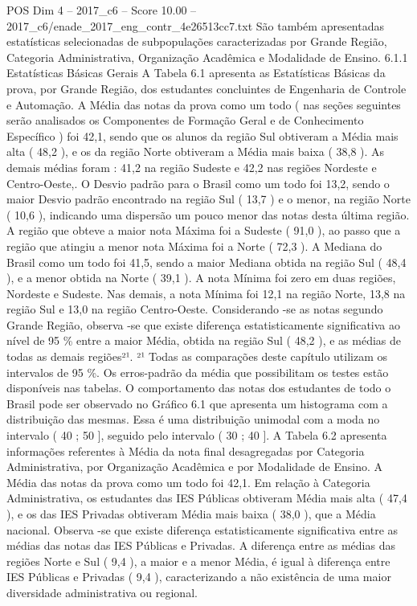 \begin{textsample}{POS Dim 4 – 2017\_c6 – Score 10.00 – 2017\_c6/enade\_2017\_eng\_contr\_4e26513cc7.txt}
São também apresentadas estatísticas selecionadas de subpopulações caracterizadas por Grande Região, Categoria Administrativa, Organização Acadêmica e Modalidade de Ensino. 6.1.1 Estatísticas Básicas Gerais A Tabela 6.1 apresenta as Estatísticas Básicas da prova, por Grande Região, dos estudantes concluintes de Engenharia de Controle e Automação.
A Média das notas da prova como um todo ( nas seções seguintes serão analisados os Componentes de Formação Geral e de Conhecimento Específico ) foi 42,1, sendo que os alunos da região Sul obtiveram a Média mais alta ( 48,2 ), e os da região Norte obtiveram a Média mais baixa ( 38,8 ).
As demais médias foram : 41,2 na região Sudeste e 42,2 nas regiões Nordeste e Centro-Oeste,.
O Desvio padrão para o Brasil como um todo foi 13,2, sendo o maior Desvio padrão encontrado na região Sul ( 13,7 ) e o menor, na região Norte ( 10,6 ), indicando uma dispersão um pouco menor das notas desta última região.
A região que obteve a maior nota Máxima foi a Sudeste ( 91,0 ), ao passo que a região que atingiu a menor nota Máxima foi a Norte ( 72,3 ).
A Mediana do Brasil como um todo foi 41,5, sendo a maior Mediana obtida na região Sul ( 48,4 ), e a menor obtida na Norte ( 39,1 ).
A nota Mínima foi zero em duas regiões, Nordeste e Sudeste.
Nas demais, a nota Mínima foi 12,1 na região Norte, 13,8 na região Sul e 13,0 na região Centro-Oeste.
Considerando -se as notas segundo Grande Região, observa -se que existe diferença estatisticamente significativa ao nível de 95 \% entre a maior Média, obtida na região Sul ( 48,2 ), e as médias de todas as demais regiões²¹. ²¹ Todas as comparações deste capítulo utilizam os intervalos de 95 \%.
Os erros-padrão da média que possibilitam os testes estão disponíveis nas tabelas.
O comportamento das notas dos estudantes de todo o Brasil pode ser observado no Gráfico 6.1 que apresenta um histograma com a distribuição das mesmas.
Essa é uma distribuição unimodal com a moda no intervalo ( 40 ; 50 ], seguido pelo intervalo ( 30 ; 40 ].
A Tabela 6.2 apresenta informações referentes à Média da nota final desagregadas por Categoria Administrativa, por Organização Acadêmica e por Modalidade de Ensino.
A Média das notas da prova como um todo foi 42,1.
Em relação à Categoria Administrativa, os estudantes das IES Públicas obtiveram Média mais alta ( 47,4 ), e os das IES Privadas obtiveram Média mais baixa ( 38,0 ), que a Média nacional.
Observa -se que existe diferença estatisticamente significativa entre as médias das notas das IES Públicas e Privadas.
A diferença entre as médias das regiões Norte e Sul ( 9,4 ), a maior e a menor Média, é igual à diferença entre IES Públicas e Privadas ( 9,4 ), caracterizando a não existência de uma maior diversidade administrativa ou regional.

\end{textsample}
